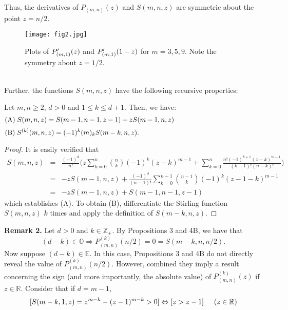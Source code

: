 \documentclass[]{amsart}
\begin{document}
\noindent
Thus, the derivatives of $P_{(m,n)}(z)$ and $S(m,n,z)$ are symmetric about the point $z = n/2$.
\begin{figure}[h]
	\centering
	\texttt{[image: fig2.jpg]}
	\caption{Plots of $\protect P'_{(m,1)}(z)$ and $\protect P'_{(m,1)}(1-z)$ for $m = 3,5,9$.  Note the symmetry about $z = 1/2$.}
\end{figure}
\\
Further, the functions $S(m,n,z)$ have the following recursive properties:
\begin{prop}
Let $m,n \geq 2$, $d > 0$ and $1 \leq k \leq d+1$.  Then, we have:
\[ \mathrm{(A)} \hspace{1mm} S(m,n,z) = S(m-1,n-1,z-1) - zS(m-1,n,z) \hspace{45mm} \]
\[ \mathrm{(B)} \hspace{1mm} S^{(k)}(m,n,z) = (-1)^{k}(m)_{k}S(m-k,n,z). \hspace{63mm} \]
\end{prop}
\begin{proof}
It is easily verified that
\begin{eqnarray}
S(m,n,z) & = & \frac{(-1)^{d}}{n!}\bigg(z\sum_{k=0}^{n}{n \choose k}(-1)^{k}(z-k)^{m-1} + \sum_{k=0}^{n}\frac{n!(-1)^{k+1}(z-k)^{m-1}}{(k-1)!(n-k)!}\bigg) \nonumber \\ \nonumber
& = & -zS(m-1,n,z) + \frac{(-1)^{d}}{(n-1)!}\sum_{k=0}^{n-1}{n-1 \choose k}(-1)^{k}(z-1-k)^{m-1} \nonumber \\ \nonumber
& = & -zS(m-1,n,z) + S(m-1,n-1,z-1)
\end{eqnarray}
which establishes (A).  To obtain (B), differentiate the Stirling function $S(m,n,z)$ $k$ times and apply the definition of $S(m-k,n,z)$.
\end{proof}
\noindent
\textbf{Remark 2.} Let $d > 0$ and $k \in \mathbb{Z}_{+}$.  By Propositions 3 and 4B, we have that
\begin{equation}
(d-k) \in \mathbb{O} \Rightarrow P^{(k)}_{(m,n)}(n/2) = 0 = S(m-k,n,n/2).
\end{equation}
Now suppose $(d-k) \in \mathbb{E}$. In this case, Propositions 3 and 4B do not directly reveal the value of $P^{(k)}_{(m,n)}(n/2)$.  However, combined they imply a result concerning the sign (and more importantly, the absolute value) of $P^{(k)}_{(m,n)}(z)$ if $z \in \mathbb{R}$.  Consider that if $d = m-1$,
\[ [S(m-k,1,z) = z^{m-k} - (z-1)^{m-k} > 0] \Leftrightarrow [z > z-1] \hspace{5mm} (z \in \mathbb{R})  \]
\end{document}
